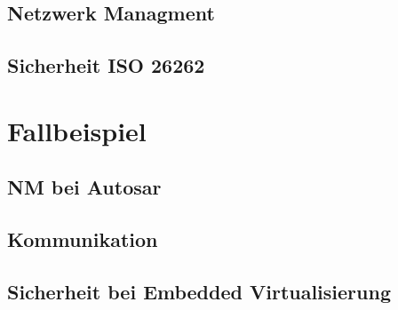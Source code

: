 \documentclass[
  a4paper,					    %
  twoside,
  DIV=calc,     				%
  bibliography=totoc,
  cleardoublepage=empty,
  ngerman,     					%
  final       					%
]{scrbook}
\begin{document}
\section{Netzwerk Managment}
\label{sec:Netzwerk Managment}


\section{Sicherheit ISO 26262}
\label{sec:Sicherheit}









\chapter{Fallbeispiel}
\label{sec:Fallbeispiel}


\section{NM bei Autosar}
\label{sec:AutosarNM}




\section{Kommunikation}
\label{sec:Kommunikation}


\section{Sicherheit bei Embedded Virtualisierung}
\label{sec:SicherheitEV}


\end{document}
